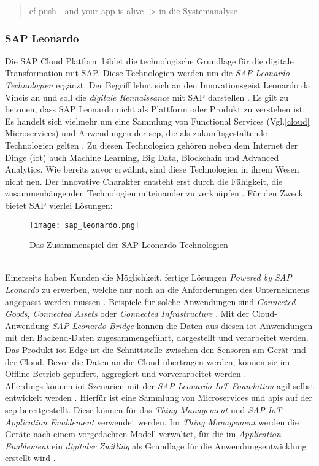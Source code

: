 \begin{quotation}
  cf push - and your app is alive -> in die Systemanalyse
\end{quotation}
\subsubsection{SAP Leonardo}

Die SAP Cloud Platform bildet die technologische Grundlage für die digitale Transformation mit SAP. Diese Technologien werden um die \textit{SAP-Leonardo-Technologien} ergänzt. Der Begriff lehnt sich an den Innovationsgeist Leonardo da Vincis an und soll die \textit{digitale Rennaissance} mit SAP  darstellen \citep{Howells2017}. Es gilt zu betonen, dass SAP Leonardo nicht als Plattform oder Produkt zu verstehen ist. Es handelt sich vielmehr um eine Sammlung von Functional Services (Vgl.\ref{cloud} Microservices) und Anwendungen der \ac{scp}, die als zukunftsgestaltende Technologien gelten \citep{Elsner2018}. Zu diesen Technologien gehören neben dem Internet der Dinge (\acf{iot}) auch Machine Learning, Big Data, Blockchain und Advanced Analytics. Wie bereits zuvor erwähnt, sind diese Technologien in ihrem Wesen nicht neu. Der innovative Charakter entsteht erst durch die Fähigkeit, die zusammenhängenden Technologien miteinander zu verknüpfen \citep{Utecht2018}. Für den Zweck bietet SAP vierlei Lösungen:
\begin{figure}[ht]
  \centering
  \texttt{[image: sap\_leonardo.png]}
  \caption{Das Zusammenspiel der SAP-Leonardo-Technologien \citep[S. 87]{Elsner2018}}
\end{figure}
 \\Einerseits haben Kunden die Möglichkeit, fertige Lösungen \textit{Powered by SAP Leonardo} zu erwerben, welche nur noch an die Anforderungen des Unternehmens angepasst werden müssen \citep{Utecht2018}. Beispiele für solche Anwendungen sind \textit{Connected Goods}, \textit{Connected Assets} oder \textit{Connected Infrastructure} \citep{Elsner2018}. Mit der Cloud-Anwendung \textit{SAP Leonardo Bridge} können die Daten aus diesen \ac{iot}-Anwendungen mit den Backend-Daten zugesammengeführt, dargestellt und verarbeitet werden. Das Produkt \ac{iot}-Edge ist die Schnittstelle zwischen den Sensoren am Gerät und der Cloud. Bevor die Daten an die Cloud übertragen werden, können sie im Offline-Betrieb gepuffert, aggregiert und vorverarbeitet werden \citep{Utecht2018}.
\\Allerdings können \ac{iot}-Szenarien mit der \textit{SAP Leonardo IoT Foundation} agil selbst entwickelt werden \citep{Elsner2018}. Hierfür ist eine Sammlung von Microservices und \ac{api}s auf der \ac{scp} bereitgestellt. Diese können für das \textit{Thing Management} und \textit{SAP IoT Application Enablement} verwendet werden. Im \textit{Thing Management} werden die Geräte nach einem vorgedachten Modell verwaltet, für die im \textit{Application Enablement} ein \textit{digitaler Zwilling} als Grundlage für die Anwendungsentwicklung erstellt wird \citep{Elsner2018}.
